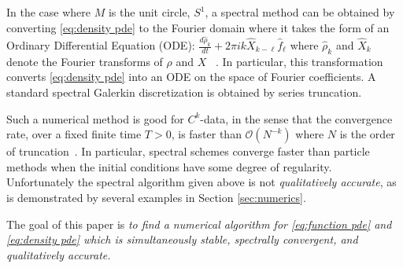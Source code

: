 \documentclass[final,leqno]{siamart}
\begin{document}
In the case where $M$ is the unit circle, $S^{1}$, a spectral method can be obtained by converting \eqref{eq:density pde} to the Fourier domain where it takes the form
of an Ordinary Differential Equation (ODE):
$
	\frac{d \hat{\rho}_{k}}{dt} + 2\pi i k  \widehat{X}_{k-\ell} \hat{f}_{\ell} 
$
where $\hat{\rho}_{k}$ and $\widehat{X}_{k}$ denote the Fourier transforms of $\rho$ and $X$ ~\cite{Taylor1974}.
In particular, this transformation converts \eqref{eq:density pde} into an ODE on the space of Fourier coefficients.
A standard spectral Galerkin discretization is obtained by series truncation. 

Such a numerical method is good for $C^{k}$-data, in the sense that the convergence rate, over a fixed finite time $T>0$, is faster than $\mathcal{O}(N^{-k})$  where $N$ is the order of truncation~\cite{Gottlieb2001,Gottlieb1977numerical}.
In particular, spectral schemes converge faster than particle methods when the initial conditions have some degree of regularity.
Unfortunately the spectral algorithm given above is not \emph{qualitatively accurate}, as is demonstrated by several examples in Section \ref{sec:numerics}.

The goal of this paper is
\emph{to find a numerical algorithm for \eqref{eq:function pde} and \eqref{eq:density pde} which is simultaneously stable, spectrally convergent, and qualitatively accurate.}
\end{document}
